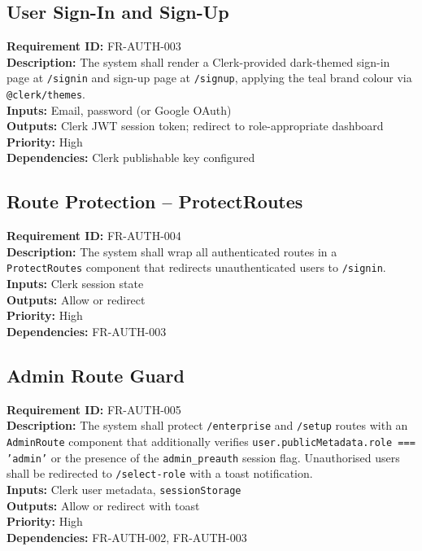\documentclass{fisatinternship}
\begin{document}
\subsection{User Sign-In and Sign-Up}
\textbf{Requirement ID:} FR-AUTH-003\\
\textbf{Description:} The system shall render a Clerk-provided dark-themed sign-in page
at \texttt{/signin} and sign-up page at \texttt{/signup}, applying the teal brand colour
via \texttt{@clerk/themes}.\\
\textbf{Inputs:} Email, password (or Google OAuth)\\
\textbf{Outputs:} Clerk JWT session token; redirect to role-appropriate dashboard\\
\textbf{Priority:} High\\
\textbf{Dependencies:} Clerk publishable key configured

\vspace{0.4cm}

\subsection{Route Protection -- ProtectRoutes}
\textbf{Requirement ID:} FR-AUTH-004\\
\textbf{Description:} The system shall wrap all authenticated routes in a
\texttt{ProtectRoutes} component that redirects unauthenticated users to \texttt{/signin}.\\
\textbf{Inputs:} Clerk session state\\
\textbf{Outputs:} Allow or redirect\\
\textbf{Priority:} High\\
\textbf{Dependencies:} FR-AUTH-003

\vspace{0.4cm}

\subsection{Admin Route Guard}
\textbf{Requirement ID:} FR-AUTH-005\\
\textbf{Description:} The system shall protect \texttt{/enterprise} and \texttt{/setup}
routes with an \texttt{AdminRoute} component that additionally verifies
\texttt{user.publicMetadata.role === 'admin'} or the presence of the
\texttt{admin\_preauth} session flag. Unauthorised users shall be redirected to
\texttt{/select-role} with a toast notification.\\
\textbf{Inputs:} Clerk user metadata, \texttt{sessionStorage}\\
\textbf{Outputs:} Allow or redirect with toast\\
\textbf{Priority:} High\\
\textbf{Dependencies:} FR-AUTH-002, FR-AUTH-003
\end{document}
